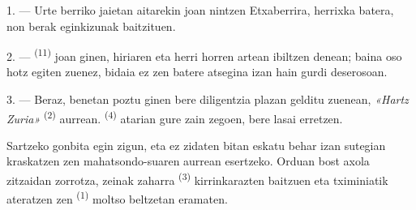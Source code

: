 %
%


\VUsaut{4.0mm}
\VUsaut{3.0mm}
\VUfilet{16mm}
\VUsaut{5.6mm}
\VUsaut{3.0mm}

\VUsaut{3.0mm}

\VUsaut{4.0mm}

1. --- Urte berriko jaietan aitarekin joan nintzen Etxaberrira, herrixka batera,
non berak eginkizunak baitzituen.

2. ---  \textsuperscript{(11)} joan ginen, hiriaren eta herri
horren artean ibiltzen denean; baina oso hotz egiten zuenez, bidaia ez zen batere
atsegina izan hain gurdi deserosoan.

3. --- Beraz, benetan poztu ginen  bere diligentzia plazan
gelditu zuenean, \textit{«Hartz Zuria»}  \textsuperscript{(2)}
aurrean.  \textsuperscript{(4)} atarian gure zain zegoen, bere
 lasai erretzen.

Sartzeko gonbita egin zigun, eta ez zidaten bitan eskatu behar izan sutegian
kraskatzen zen mahatsondo-suaren aurrean esertzeko. Orduan bost axola zitzaidan
 zorrotza, zeinak  zaharra
\textsuperscript{(3)} kirrinkarazten baitzuen eta tximiniatik ateratzen zen
 \textsuperscript{(1)} moltso beltzetan eramaten.

